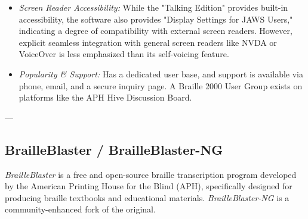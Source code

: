 \begin{itemize}
\begin{itemize}
        \item \emph{Screen Reader Accessibility:} While the "Talking Edition" provides built-in accessibility, the software also provides "Display Settings for JAWS Users," indicating a degree of compatibility with external screen readers. However, explicit seamless integration with general screen readers like NVDA or VoiceOver is less emphasized than its self-voicing feature.
        \item \emph{Popularity \& Support:} Has a dedicated user base, and support is available via phone, email, and a secure inquiry page. A Braille 2000 User Group exists on platforms like the APH Hive Discussion Board.
    \end{itemize}
\end{itemize}

---

\subsection{BrailleBlaster / BrailleBlaster-NG}
\emph{BrailleBlaster} is a free and open-source braille transcription program developed by the American Printing House for the Blind (APH), specifically designed for producing braille textbooks and educational materials. \emph{BrailleBlaster-NG} is a community-enhanced fork of the original.

